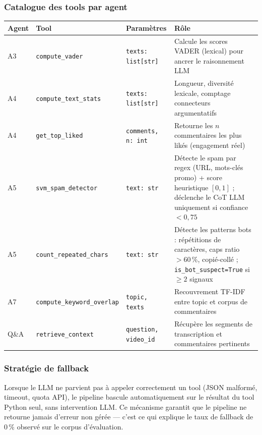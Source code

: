 \documentclass[12pt, a4paper]{article}
\begin{document}
\subsubsection{Catalogue des tools par agent}

\begin{center}
\small
\begin{tabular}{p{1.4cm}p{2.8cm}p{3.2cm}p{3.8cm}}
\toprule
\textbf{Agent} & \textbf{Tool} & \textbf{Paramètres} & \textbf{Rôle} \\
\midrule
A3 & \texttt{compute\_vader} & \texttt{texts: list[str]} &
  Calcule les scores VADER (lexical) pour ancrer le raisonnement LLM \\
A4 & \texttt{compute\_text\_stats} & \texttt{texts: list[str]} &
  Longueur, diversité lexicale, comptage connecteurs argumentatifs \\
A4 & \texttt{get\_top\_liked} & \texttt{comments, n: int} &
  Retourne les $n$ commentaires les plus likés (engagement réel) \\
A5 & \texttt{svm\_spam\_detector} & \texttt{text: str} &
  Détecte le spam par regex (URL, mots-clés promo) + score heuristique $[0{,}1]$ ;
  déclenche le CoT LLM uniquement si confiance $< 0{,}75$ \\
A5 & \texttt{count\_repeated\_chars} & \texttt{text: str} &
  Détecte les patterns bots : répétitions de caractères, caps ratio $> 60\,\%$,
  copié-collé ; \texttt{is\_bot\_suspect=True} si $\geq 2$ signaux \\
A7 & \texttt{compute\_keyword\_overlap} & \texttt{topic, texts} &
  Recouvrement TF-IDF entre topic et corpus de commentaires \\
Q\&A & \texttt{retrieve\_context} & \texttt{question, video\_id} &
  Récupère les segments de transcription et commentaires pertinents \\
\bottomrule
\end{tabular}
\end{center}

\subsubsection{Stratégie de fallback}

Lorsque le LLM ne parvient pas à appeler correctement un tool (JSON malformé,
timeout, quota API), le pipeline bascule automatiquement sur le résultat
du tool Python seul, sans intervention LLM. Ce mécanisme garantit que le
pipeline ne retourne jamais d'erreur non gérée — c'est ce qui explique le
taux de fallback de $0\,\%$ observé sur le corpus d'évaluation.
\end{document}
